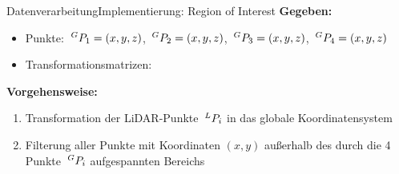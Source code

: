 \documentclass[169, handout	]{THIbeamer} %
\begin{document}
	\begin{frame}{Datenverarbeitung}{Implementierung: Region of Interest}	
		\textbf{Gegeben:} 
		\begin{itemize}
			\item Punkte: $\hspace*{0.2em}^G\vspace*{-0.2em}P_{1}=(x,y,z)$, $\hspace*{0.2em}^G\vspace*{-0.2em}P_{2}=(x,y,z)$, $\hspace*{0.2em}^G\vspace*{-0.2em}P_{3}=(x,y,z)$, $\hspace*{0.2em}^G\vspace*{-0.2em}P_{4}=(x,y,z)$		
			\item Transformationsmatrizen: 
		\end{itemize}
		\textbf{Vorgehensweise:}
		\begin{enumerate}
			\item Transformation der LiDAR-Punkte $\hspace*{0.2em}^L\vspace*{-0.2em}P_{i}$ in das globale Koordinatensystem 
			\item Filterung aller Punkte mit Koordinaten $(x,y)$ außerhalb des durch die 4 Punkte $\hspace*{0.2em}^G\vspace*{-0.2em}P_{i}$ aufgespannten Bereichs
		\end{enumerate}
	\end{frame}
\end{document}

